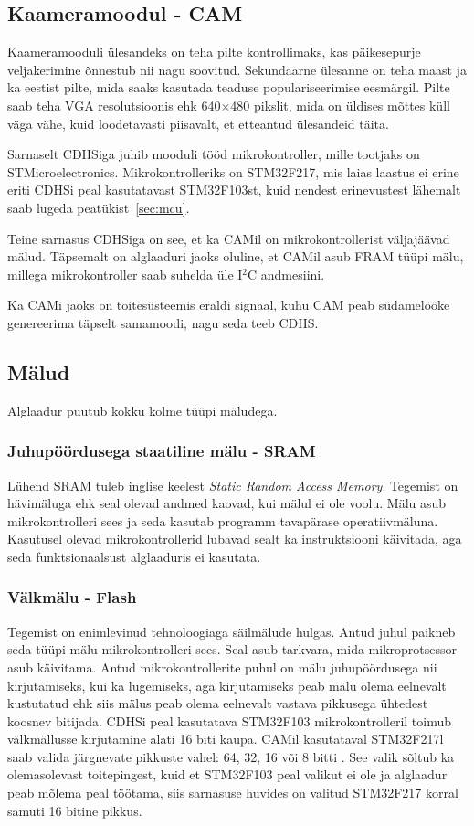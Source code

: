 \documentclass[12pt,a4paper]{article}
\newcommand{\iic}{I${}^2$C }
\begin{document}
\subsection{Kaameramoodul - CAM}
Kaameramooduli ülesandeks on teha pilte kontrollimaks, kas päikesepurje
veljakerimine õnnestub nii nagu soovitud. Sekundaarne ülesanne on teha maast ja
ka eestist pilte, mida saaks kasutada teaduse populariseerimise eesmärgil.
Pilte saab teha VGA resolutsioonis ehk 640\(\times\)480 pikslit, mida on üldises
mõttes küll väga vähe, kuid loodetavasti piisavalt, et etteantud ülesandeid
täita.

Sarnaselt CDHSiga juhib mooduli tööd mikrokontroller, mille tootjaks on
STMicroelectronics. Mikrokontrolleriks on STM32F217, mis laias laastus ei erine
eriti CDHSi peal kasutatavast STM32F103st, kuid nendest erinevustest lähemalt
saab lugeda peatükist~\ref{sec:mcu}.

Teine sarnasus CDHSiga on see, et ka CAMil on mikrokontrollerist väljajäävad
mälud. Täpsemalt on alglaaduri jaoks oluline, et CAMil asub FRAM tüüpi mälu,
millega mikrokontroller saab suhelda üle \iic andmesiini.

Ka CAMi jaoks on toitesüsteemis eraldi signaal, kuhu CAM peab südamelööke
genereerima täpselt samamoodi, nagu seda teeb CDHS.

\subsection{Mälud}
\label{sec:m2lud}
Alglaadur puutub kokku kolme tüüpi mäludega.

\subsubsection{Juhupöördusega staatiline mälu - SRAM}
Lühend SRAM tuleb inglise keelest \textit{Static Random Access Memory}. Tegemist
on hävimäluga ehk seal olevad andmed kaovad, kui mälul ei ole voolu. Mälu asub
mikrokontrolleri sees ja seda kasutab programm tavapärase operatiivmäluna.
Kasutusel olevad mikrokontrollerid lubavad sealt ka instruktsiooni käivitada,
aga seda funktsionaalsust alglaaduris ei kasutata.

\subsubsection{Välkmälu - Flash}
Tegemist on enimlevinud tehnoloogiaga säilmälude hulgas. Antud juhul paikneb
seda tüüpi mälu mikrokontrolleri sees. Seal asub tarkvara, mida mikroprotsessor
asub käivitama. Antud mikrokontrollerite puhul on mälu juhupöördusega nii
kirjutamiseks, kui ka lugemiseks, aga kirjutamiseks peab mälu olema eelnevalt
kustutatud ehk siis mälus peab olema eelnevalt vastava pikkusega ühtedest
koosnev bitijada. CDHSi peal kasutatava STM32F103 mikrokontrolleril toimub
välkmällusse kirjutamine alati 16 biti kaupa. CAMil kasutataval STM32F217l saab
valida järgnevate pikkuste vahel: 64, 32, 16 või 8 bitti \cite{f2fpm}. See valik
sõltub ka olemasolevast toitepingest, kuid et STM32F103 peal valikut ei ole ja
alglaadur peab mõlema peal töötama, siis sarnasuse huvides on valitud STM32F217
korral samuti 16 bitine pikkus.
\end{document}
